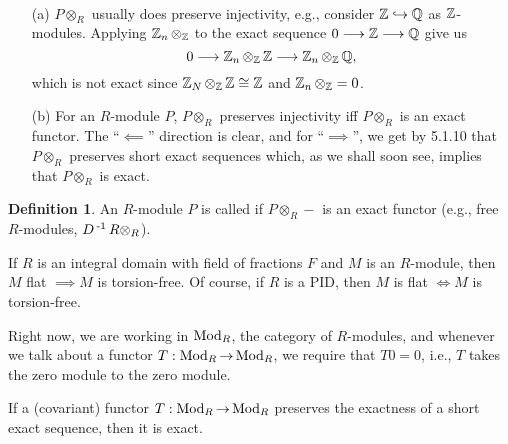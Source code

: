 \documentclass[11pt]{book}
\theoremstyle{definition}   \newtheorem{defn}[counter]{Definition} %
\DeclareMathOperator{\ra}{\rightarrow}   \DeclareMathOperator{\Poly}{\mathbf{P}}   \DeclareMathOperator{\spn}{\textnormal{span}}   \DeclareMathOperator{\aut}{\textnormal{Aut}}
\newcommand{\vs}{\vspace{8pt}}   \newcommand{\hs}{\hspace{8pt}}
\numberwithin{counter}{chapter}
\begin{document}
\vs

\begin{remark}\ 
\begin{enumerate}
\item[(a)] $P \otimes_R$ usually does  preserve injectivity, e.g., consider $\operatorname{\mathbb{Z}} \hookrightarrow \operatorname{\mathbb{Q}}$ as $\operatorname{\mathbb{Z}}$-modules. Applying $\operatorname{\mathbb{Z}}_n \otimes_{\operatorname{\mathbb{Z}}}$ to the exact sequence $0 \longrightarrow \operatorname{\mathbb{Z}} \longrightarrow \operatorname{\mathbb{Q}}$ give us
	\[0 \longrightarrow \operatorname{\mathbb{Z}}_n \otimes_{\operatorname{\mathbb{Z}}} \operatorname{\mathbb{Z}} \longrightarrow \operatorname{\mathbb{Z}}_n \otimes_{\operatorname{\mathbb{Z}}} \operatorname{\mathbb{Q}}, \]
which is not exact since $\operatorname{\mathbb{Z}}_N \otimes_{\operatorname{\mathbb{Z}}} \operatorname{\mathbb{Z}} \cong \operatorname{\mathbb{Z}}$ and $\operatorname{\mathbb{Z}}_n \otimes_{\operatorname{\mathbb{Z}}} = 0$. 

\item[(b)] For an $R$-module $P$, $P \otimes_R$ preserves injectivity iff $P \otimes_R$ is an exact functor. The ``$\impliedby$'' direction is clear, and for ``$\implies$'', we get by 5.1.10 that $P \otimes_R$ preserves short exact sequences which, as we shall soon see, implies that $P \otimes_R$ is exact. 
\end{enumerate}
\end{remark}

\vs

\begin{defn}
An $R$-module $P$ is called  if $P \otimes_R -$ is an exact functor (e.g., free $R$-modules, $D\operatorname{^{-1}} R \otimes_R$). 
\end{defn}

\vs

\begin{remark*}
If $R$ is an integral domain with field of fractions $F$ and $M$ is an $R$-module, then $M$ flat $\implies M$ is torsion-free. Of course, if $R$ is a PID, then $M$ is flat $\iff M$ is torsion-free. 
\end{remark*}


Right now, we are working in $\textnormal{Mod}_R$, the category of $R$-modules, and whenever we talk about a functor $T : \tn{Mod}_R \ra \tn{Mod}_R$, we require that $T 0 = 0$, i.e., $T$ takes the zero module to the zero module. \\

\begin{lemma}
If a (covariant) functor $T : \tn{Mod}_R \ra \tn{Mod}_R$ preserves the exactness of a short exact sequence, then it is exact.
\end{lemma}
\end{document}
